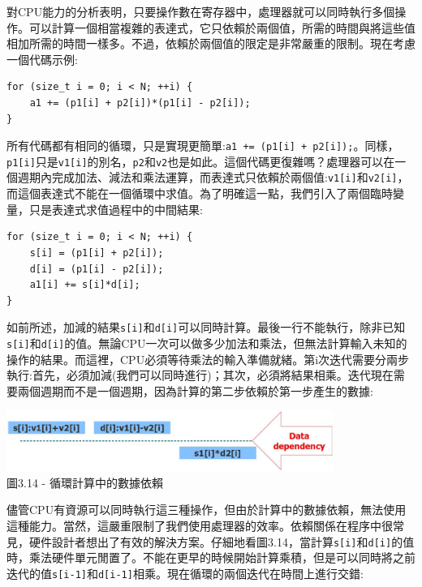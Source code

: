 對CPU能力的分析表明，只要操作數在寄存器中，處理器就可以同時執行多個操作。可以計算一個相當複雜的表達式，它只依賴於兩個值，所需的時間與將這些值相加所需的時間一樣多。不過，依賴於兩個值的限定是非常嚴重的限制。現在考慮一個代碼示例:

\begin{lstlisting}[style=styleCXX]
for (size_t i = 0; i < N; ++i) {
	a1 += (p1[i] + p2[i])*(p1[i] - p2[i]);
}
\end{lstlisting}

所有代碼都有相同的循環，只是實現更簡單:\texttt{a1 += (p1[i] + p2[i]);}。同樣，\texttt{p1[i]}只是\texttt{v1[i]}的別名，\texttt{p2}和\texttt{v2}也是如此。這個代碼更復雜嗎？處理器可以在一個週期內完成加法、減法和乘法運算，而表達式只依賴於兩個值:\texttt{v1[i]}和\texttt{v2[i]}，而這個表達式不能在一個循環中求值。為了明確這一點，我們引入了兩個臨時變量，只是表達式求值過程中的中間結果:

\begin{lstlisting}[style=styleCXX]
for (size_t i = 0; i < N; ++i) {
	s[i] = (p1[i] + p2[i]);
	d[i] = (p1[i] - p2[i]);
	a1[i] += s[i]*d[i];
}
\end{lstlisting}

如前所述，加減的結果\texttt{s[i]}和\texttt{d[i]}可以同時計算。最後一行不能執行，除非已知\texttt{s[i]}和\texttt{d[i]}的值。無論CPU一次可以做多少加法和乘法，但無法計算輸入未知的操作的結果。而這裡，CPU必須等待乘法的輸入準備就緒。第i次迭代需要分兩步執行:首先，必須加減(我們可以同時進行)；其次，必須將結果相乘。迭代現在需要兩個週期而不是一個週期，因為計算的第二步依賴於第一步產生的數據:

\begin{center}
\includegraphics[width=0.8\textwidth]{content/1/chapter3/images/14.jpg}\\
圖3.14 - 循環計算中的數據依賴
\end{center}

儘管CPU有資源可以同時執行這三種操作，但由於計算中的數據依賴，無法使用這種能力。當然，這嚴重限制了我們使用處理器的效率。依賴關係在程序中很常見，硬件設計者想出了有效的解決方案。仔細地看圖3.14，當計算\texttt{s[i]}和\texttt{d[i]}的值時，乘法硬件單元閒置了。不能在更早的時候開始計算乘積，但是可以同時將之前迭代的值\texttt{s[i-1]}和\texttt{d[i-1]}相乘。現在循環的兩個迭代在時間上進行交錯:

